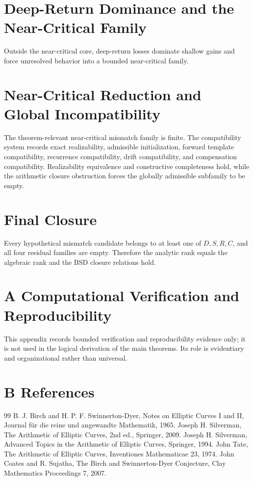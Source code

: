 \documentclass[11pt]{article}
\theoremstyle{definition}
\begin{document}
\section{Deep-Return Dominance and the Near-Critical Family}
Outside the near-critical core, deep-return losses dominate shallow gains and force unresolved behavior into a bounded near-critical family.
\section{Near-Critical Reduction and Global Incompatibility}
The theorem-relevant near-critical mismatch family is finite. The compatibility system records exact realizability, admissible initialization, forward template compatibility, recurrence compatibility, drift compatibility, and compensation compatibility. Realizability equivalence and constructive completeness hold, while the arithmetic closure obstruction forces the globally admissible subfamily to be empty.
\section{Final Closure}
Every hypothetical mismatch candidate belongs to at least one of $D,S,R,C$, and all four residual families are empty. Therefore the analytic rank equals the algebraic rank and the BSD closure relations hold.

\section*{A Computational Verification and Reproducibility}
This appendix records bounded verification and reproducibility evidence only; it is not used in the logical derivation of the main theorems. Its role is evidentiary and organizational rather than universal.

\section*{B References}
\begin{thebibliography}{99}
 B. J. Birch and H. P. F. Swinnerton-Dyer, Notes on Elliptic Curves I and II, Journal für die reine und angewandte Mathematik, 1965.
 Joseph H. Silverman, The Arithmetic of Elliptic Curves, 2nd ed., Springer, 2009.
 Joseph H. Silverman, Advanced Topics in the Arithmetic of Elliptic Curves, Springer, 1994.
 John Tate, The Arithmetic of Elliptic Curves, Inventiones Mathematicae 23, 1974.
 John Coates and R. Sujatha, The Birch and Swinnerton-Dyer Conjecture, Clay Mathematics Proceedings 7, 2007.
\end{thebibliography}
\end{document}
